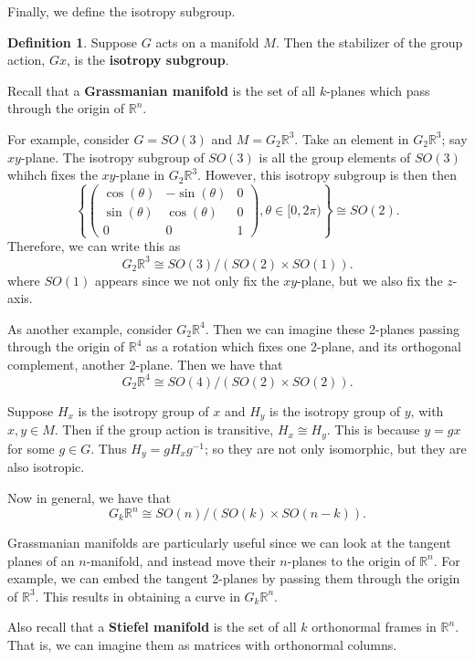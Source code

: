 \documentclass[12pt,letterpaper,boxed]{maths_v5}
\newcommand{\rr}{\mathbb{R}}
\theoremstyle{definition}
\newtheorem{definition}{Definition}[section]
\begin{document}
Finally, we define the isotropy subgroup. 

\begin{definition}
    Suppose $G$ acts on a manifold $M$. Then the stabilizer of the group action, $Gx$, 
    is the \textbf{isotropy subgroup}.
\end{definition}

Recall that a \textbf{Grassmanian manifold} is the set of all $k$-planes which 
pass through the origin of $\rr^n$. 

For example, consider $G = SO(3)$ and $M = G_2\rr^3$. Take an element in $G_2\rr^3$; 
say $xy$-plane. The isotropy subgroup of $SO(3)$ is all the group elements of $SO(3)$ 
whihch fixes the $xy$-plane in $G_2\rr^3$. However, this isotropy subgroup is then 
then 
\[
    \left\{ 
    \begin{pmatrix}
    \cos(\theta) & -\sin(\theta) & 0 \\
    \sin(\theta) & \cos(\theta) & 0\\
    0 & 0 & 1
    \end{pmatrix}, \theta \in [0, 2\pi) \right\}
    \cong SO(2).
\]
Therefore, we can write this as 
\[
    G_2\rr^3 \cong SO(3)/(SO(2)\times SO(1)).
\]
where $SO(1)$ appears since we not only fix the $xy$-plane, but we also fix the 
$z$-axis. 

As another example, consider $G_2\rr^4$. Then we can imagine these 2-planes passing through the 
origin of $\rr^4$ as a rotation which fixes one 2-plane, and its orthogonal complement, 
another 2-plane. Then we have that 
\[
    G_2\rr^4 \cong SO(4)/(SO(2)\times SO(2)).
\]

Suppose $H_x$ is the isotropy group of $x$ and $H_y$ is the isotropy group of $y$, with $x,y \in M$.
Then if the group action is transitive, $H_x \cong H_y$. This is because $y = gx$ for some $g\in G$. Thus 
$H_y = gH_xg^{-1}$; so they are not only isomorphic, but they are also isotropic. 

Now in general, we have that 
\[
    G_k\rr^n \cong SO(n)/(SO(k)\times SO(n-k)).
\]

Grassmanian manifolds are particularly useful since we can look at the tangent planes of 
an $n$-manifold, and instead move their $n$-planes to the origin of $\rr^n$. For example, 
we can embed the tangent 2-planes by passing them through the origin of $\rr^3$. This 
results in obtaining a curve in $G_k\rr^n$. 

Also recall that a \textbf{Stiefel manifold}  is the set of all $k$ orthonormal frames 
in $\rr^n$. That is, we can imagine them as matrices with orthonormal columns.
\end{document}
